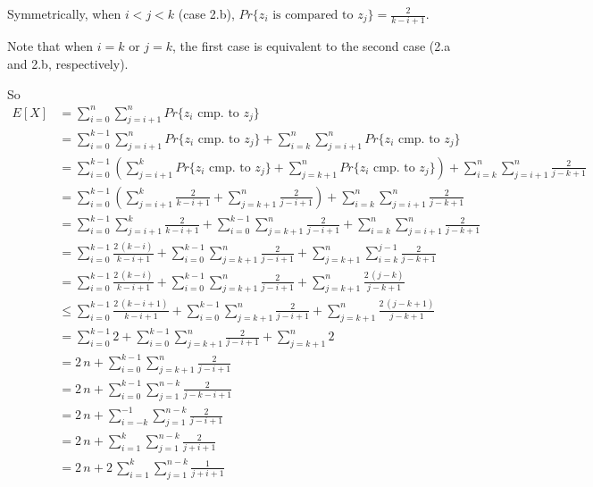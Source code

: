 \documentclass[11pt]{article}
\begin{document}
Symmetrically, when $i < j < k$ (case 2.b),
 $Pr\{z_i \text{ is compared to } z_j\} = \displaystyle\frac{2}{k-i+1}$. 

Note that when $i = k$ or $j = k$, the first case is equivalent to the second
 case (2.a and 2.b, respectively). 

So $$
\begin{aligned}
E[X] & = \sum_{i=0}^n{\sum_{j=i+1}^n{Pr\{z_i \text{ cmp. to } z_j\}}} \\
	 & = \sum_{i=0}^{k-1}{\sum_{j=i+1}^n{Pr\{z_i \text{ cmp. to } z_j\}}} 
	   + \sum_{i=k}^n{\sum_{j=i+1}^n{Pr\{z_i \text{ cmp. to } z_j\}}} \\
	 & = \sum_{i=0}^{k-1}{\left(
	 			  \sum_{j=i+1}^k{Pr\{z_i \text{ cmp. to } z_j\}}
	 			+ \sum_{j=k+1}^n{Pr\{z_i \text{ cmp. to } z_j\}}
	 		\right)} 
	   + \sum_{i=k}^n{\sum_{j=i+1}^n{\displaystyle\frac{2}{j-k+1}}} \\
	 & = \sum_{i=0}^{k-1}{\left(
	 			  \sum_{j=i+1}^k{\displaystyle\frac{2}{k-i+1}}
	 			+ \sum_{j=k+1}^n{\displaystyle\frac{2}{j-i+1}}
	 		\right)} 
	   + \sum_{i=k}^n{\sum_{j=i+1}^n{\displaystyle\frac{2}{j-k+1}}} \\
	 & = \sum_{i=0}^{k-1}{\sum_{j=i+1}^k{\displaystyle\frac{2}{k-i+1}}}
	   + \sum_{i=0}^{k-1}{\sum_{j=k+1}^n{\displaystyle\frac{2}{j-i+1}}}
	   + \sum_{i=k}^n{\sum_{j=i+1}^n{\displaystyle\frac{2}{j-k+1}}} \\
	 & = \sum_{i=0}^{k-1}{\displaystyle\frac{2\,(k-i)}{k-i+1}}
	   + \sum_{i=0}^{k-1}{\sum_{j=k+1}^n{\displaystyle\frac{2}{j-i+1}}}
	   + \sum_{j=k+1}^n{\sum_{i=k}^{j-1}{\displaystyle\frac{2}{j-k+1}}} \\
	 & = \sum_{i=0}^{k-1}{\displaystyle\frac{2\,(k-i)}{k-i+1}}
	   + \sum_{i=0}^{k-1}{\sum_{j=k+1}^n{\displaystyle\frac{2}{j-i+1}}}
	   + \sum_{j=k+1}^n{\displaystyle\frac{2\,(j-k)}{j-k+1}} \\
	 & \le \sum_{i=0}^{k-1}{\displaystyle\frac{2\,(k-i+1)}{k-i+1}}
	   + \sum_{i=0}^{k-1}{\sum_{j=k+1}^n{\displaystyle\frac{2}{j-i+1}}}
	   + \sum_{j=k+1}^n{\displaystyle\frac{2\,(j-k+1)}{j-k+1}} \\
	 & = \sum_{i=0}^{k-1}{2}
	   + \sum_{i=0}^{k-1}{\sum_{j=k+1}^n{\displaystyle\frac{2}{j-i+1}}}
	   + \sum_{j=k+1}^n{2} \\
	 & = 2\,n
	   + \sum_{i=0}^{k-1}{\sum_{j=k+1}^n{\displaystyle\frac{2}{j-i+1}}}\\
	 & = 2\,n
	   + \sum_{i=0}^{k-1}{\sum_{j=1}^{n-k}{\displaystyle\frac{2}{j-k-i+1}}}\\
	 & = 2\,n
	   + \sum_{i=-k}^{-1}{\sum_{j=1}^{n-k}{\displaystyle\frac{2}{j-i+1}}}\\
	 & = 2\,n
	   + \sum_{i=1}^k{\sum_{j=1}^{n-k}{\displaystyle\frac{2}{j+i+1}}} \\
	 & = 2\,n
	   + 2\,\sum_{i=1}^k{\sum_{j=1}^{n-k}{\displaystyle\frac{1}{j+i+1}}}
\end{aligned}
$$
\end{document}
